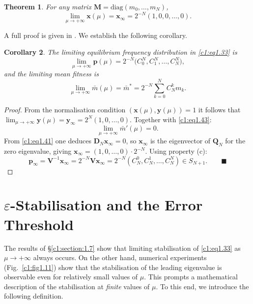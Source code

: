 \documentclass[12pt]{report}
\newcommand{\bs}[1]{\bm{#1}}
\newtheorem{theorem}{Theorem}[section]
\newtheorem{corollary}[theorem]{Corollary}
\theoremstyle{definition}
\theoremstyle{remark}
\begin{document}
\begin{theorem}
For any matrix $\bs{M}=\mathrm{diag}(m_0,\ldots,m_N)$,
\begin{equation}
  \lim_{\mu\to+\infty}\bs{x}(\mu)=\bs{x}_\infty=2^{-N}(1,0,0,\ldots,0).
  \label{c1:eq1.48}
\end{equation}
\end{theorem}

A full proof is given in \cite{c1:bratus2014_2}.
We establish the following corollary.

\begin{corollary}
The limiting equilibrium frequency distribution in \eqref{c1:eq1.33} is
\begin{equation}
  \lim_{\mu\to+\infty}\bs{p}(\mu)
  =2^{-N}\bigl(C_0^N,C_1^N,\ldots,C_N^N\bigr),
  \label{c1:eq1.49}
\end{equation}
and the limiting mean fitness is
\begin{equation}
  \lim_{\mu\to+\infty}\bar{m}(\mu)
  =\bar{m}^*=2^{-N}\sum_{k=0}^{N}C_N^k m_k.
  \label{c1:eq1.50}
\end{equation}
\end{corollary}

\begin{proof}
From the normalisation condition $(\bs{x}(\mu),\bs{y}(\mu))=1$
it follows that
$\lim_{\mu\to+\infty}\bs{y}(\mu)=\bs{y}_\infty=2^N(1,0,\ldots,0)$.
Together with \eqref{c1:eq1.43}:
\[
  \lim_{\mu\to+\infty}\bar{m}'(\mu)=0.
\]
From \eqref{c1:eq1.41} one deduces $\bs{D}_N\bs{x}_\infty=0$, so
$\bs{x}_\infty$ is the eigenvector of $\bs{Q}_N$ for the zero
eigenvalue, giving $\bs{x}_\infty=(1,0,\ldots,0)\cdot 2^{-N}$.
Using property (c):
\[
  \bs{p}_\infty=\bs{V}^{-1}\bs{x}_\infty
  =2^{-N}\bs{V}\bs{x}_\infty
  =2^{-N}(C_N^0,C_N^1,\ldots,C_N^N)\in S_{N+1}.
  \qquad\blacksquare
\]
\end{proof}

\section{\texorpdfstring{$\varepsilon$}{epsilon}-Stabilisation and the Error Threshold}
\label{c1:section:1.8}

The results of \S\ref{c1:section:1.7} show that limiting stabilisation of
\eqref{c1:eq1.33} as $\mu\to+\infty$ always occurs.  On the other hand,
numerical experiments (Fig.~\ref{c1:fig1.11}) show that the stabilisation
of the leading eigenvalue is observable even for relatively small
values of $\mu$.  This prompts a mathematical description of the
stabilisation at \emph{finite} values of $\mu$.  To this end, we
introduce the following definition.
\end{document}
